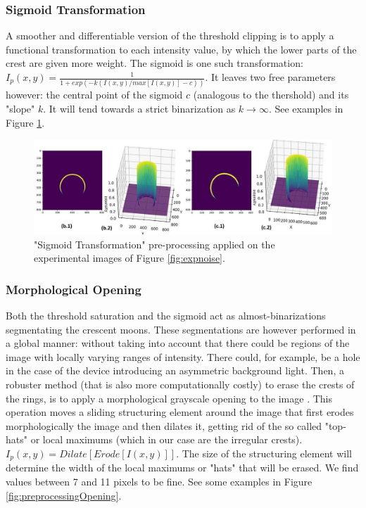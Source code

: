 \documentclass[11pt, a4paper, twoside]{article} %
\begin{document}
\subsubsection*{Sigmoid Transformation}
\vspace{-0.3cm}
A smoother and differentiable version of the threshold clipping is to apply a functional transformation to each intensity value, by which the lower parts of the crest are given more weight. The sigmoid is one such transformation: $I_p(x,y)=\frac{1}{1+exp(-k(I(x,y)/max[I(x,y)]-c))}$. It leaves two free parameters however: the central point of the sigmoid $c$ (analogous to the thershold) and its "slope" $k$. It will tend towards a strict binarization as $k\rightarrow \infty$. See examples in Figure \ref{fig:preprocessingSigmoid}.\vspace{-0.2cm}
\begin{figure}[h!] 
     \centering 
    \includegraphics[width=0.9\linewidth]{sigmoid.jpg}
    \caption{"Sigmoid Transformation" pre-processing applied on the experimental images of Figure \ref{fig:expnoise}.}
    \label{fig:preprocessingSigmoid}
\end{figure}

\subsubsection*{Morphological Opening}\vspace{-0.25cm}
Both the threshold saturation and the sigmoid act as almost-binarizations segmentating the crescent moons. These segmentations are however performed in a global manner: without taking into account that there could be regions of the image with locally varying ranges of intensity. There could, for example, be a hole in the case of the device introducing an asymmetric background light. Then, a robuster method (that is also more computationally costly) to erase the crests of the rings, is to apply a morphological grayscale opening to the image \cite{opening}. This operation moves a sliding structuring element around the image that first erodes morphologically the image and then dilates it, getting rid of the so called "top-hats" or local maximums (which in our case are the irregular crests). $I_p(x,y)=Dilate[Erode[I(x,y)]]$. The size of the structuring element will determine the width of the local maximums or "hats" that will be erased. We find values between 7 and 11 pixels to be fine. See some examples in Figure \ref{fig:preprocessingOpening}.
\end{document}
